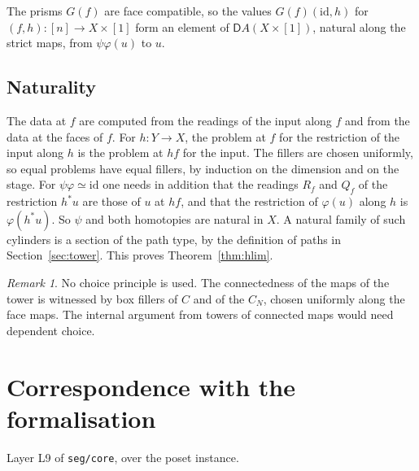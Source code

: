 \documentclass[11pt]{article}
\newcommand{\id}{\mathrm{id}}
\newcommand{\D}{\mathsf{D}}
\theoremstyle{plain}
\theoremstyle{definition}
\theoremstyle{remark}
\newtheorem{remark}[theorem]{Remark}
\begin{document}
The prisms $G(f)$ are face compatible, so the values $G(f)(\id,h)$ for
$(f,h):[n]\to X\times[1]$ form an element of $\D A(X\times[1])$, natural
along the strict maps, from $\psi\varphi(u)$ to $u$.

\subsection{Naturality}

The data at $f$ are computed from the readings of the input along $f$ and
from the data at the faces of $f$. For $h:Y\to X$, the problem at $f$ for
the restriction of the input along $h$ is the problem at $hf$ for the
input. The fillers are chosen uniformly, so equal problems have equal
fillers, by induction on the dimension and on the stage. For
$\psi\varphi\simeq\id$ one needs in addition that the readings $R_f$ and
$Q_f$ of the restriction $h^*u$ are those of $u$ at $hf$, and that the
restriction of $\varphi(u)$ along $h$ is $\varphi(h^*u)$. So $\psi$ and
both homotopies are natural in $X$. A natural family of such cylinders is
a section of the path type, by the definition of paths in
Section~\ref{sec:tower}.
This proves Theorem~\ref{thm:hlim}.

\begin{remark}
No choice principle is used. The connectedness of the maps of the tower is
witnessed by box fillers of $C$ and of the $C_N$, chosen uniformly along
the face maps. The internal argument from towers of connected maps would
need dependent choice.
\end{remark}

\appendix
\section{Correspondence with the formalisation}

\noindent Layer L9 of \texttt{seg/core}, over the poset instance.
\end{document}
